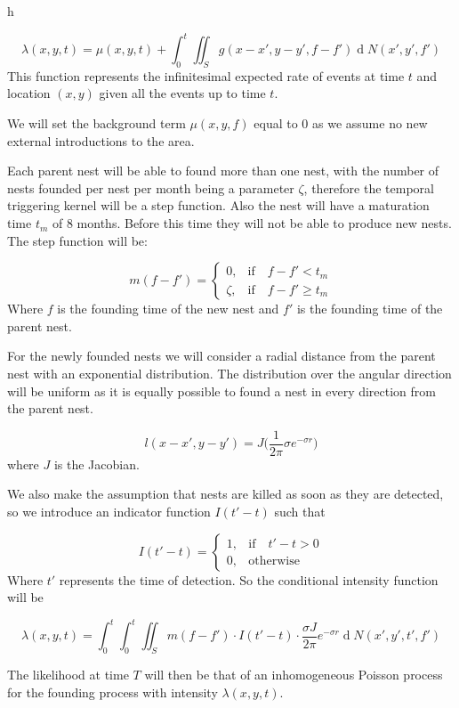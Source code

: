 h\documentclass[11pt,a4paper]{article}
\renewcommand{\d}[1]{\ensuremath{\operatorname{d}\!{#1}}}
\begin{document}
\[
\lambda(x, y, t) = \mu(x, y, t) + \int_{0}^{t} \iint_{S} g(x - x', y - y', f - f') \d N(x', y', f')
\]
This function represents the infinitesimal expected rate of events at time $t$ and location $(x, y)$ given all the events up to time $t$.

We will set the background term $\mu(x, y, f) $ equal to 0 as we assume no new external introductions to the area.

Each parent nest will be able to found more than one nest, with the number of nests founded per nest per month being a parameter $\zeta$, therefore the temporal triggering kernel will be a step function. Also the nest will have a maturation time $t_m$ of 8 months. Before this time they will not be able to produce new nests. 
The step function will be:

\[
m (f - f') =
\begin{cases}
0, & \mbox{if} \quad f - f' < t_{m} \\
\zeta, & \mbox{if} \quad f - f' \geq t_{m}
\end{cases}
\]
Where $f$ is the founding time of the new nest and $f'$ is the founding time of the parent nest.

For the newly founded nests we will consider a radial distance from the parent nest with an exponential distribution. The distribution over the angular direction will be uniform as it is equally possible to found a nest in every direction from the parent nest.

\begin{equation}
l(x - x', y - y')= J \bigg(\frac{1}{2 \pi} \sigma e^{- \sigma r}\bigg)
\end{equation}
where $J$ is the Jacobian.

We also make the assumption that nests are killed as soon as they are detected, so we introduce an indicator function $I(t' - t)$ such that

\[
I (t' - t) =
\begin{cases}
1, & \mbox{if} \quad t' -  t> 0 \\
0, & \mbox{otherwise}
\end{cases}
\]
Where $t'$ represents the time of detection. So the conditional intensity function will be

\[
\lambda(x, y, t) = \int_{0}^{t} \int_{0}^{t} \iint_{S} m(f - f') \cdot I(t' - t)\cdot \frac{\sigma J }{2 \pi} e^{- \sigma r} \d N(x',y',t',f')
\]

The likelihood at time $T$ will then be that of  an inhomogeneous Poisson process for the founding process with intensity $\lambda(x, y, t)$.
\end{document}
